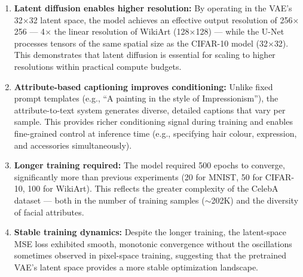 \begin{enumerate}
    \item \textbf{Latent diffusion enables higher resolution:} By operating in the VAE's 32$\times$32 latent space, the model achieves an effective output resolution of 256$\times$256 --- 4$\times$ the linear resolution of WikiArt (128$\times$128) --- while the U-Net processes tensors of the same spatial size as the CIFAR-10 model (32$\times$32). This demonstrates that latent diffusion is essential for scaling to higher resolutions within practical compute budgets.
    
    \item \textbf{Attribute-based captioning improves conditioning:} Unlike fixed prompt templates (e.g., ``A painting in the style of Impressionism''), the attribute-to-text system generates diverse, detailed captions that vary per sample. This provides richer conditioning signal during training and enables fine-grained control at inference time (e.g., specifying hair colour, expression, and accessories simultaneously).
    
    \item \textbf{Longer training required:} The model required 500 epochs to converge, significantly more than previous experiments (20 for MNIST, 50 for CIFAR-10, 100 for WikiArt). This reflects the greater complexity of the CelebA dataset --- both in the number of training samples ($\sim$202K) and the diversity of facial attributes.
    
    \item \textbf{Stable training dynamics:} Despite the longer training, the latent-space MSE loss exhibited smooth, monotonic convergence without the oscillations sometimes observed in pixel-space training, suggesting that the pretrained VAE's latent space provides a more stable optimization landscape.
\end{enumerate}
